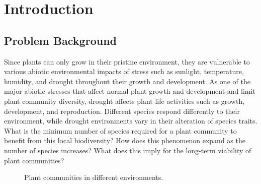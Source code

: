 \documentclass[12pt]{article}
\begin{document}

\clearpage
\pagestyle{fancy}

\tableofcontents

\newpage
\setcounter{page}{1}
\section{Introduction}

\subsection{Problem Background}

Since plants can only grow in their pristine environment, they are vulnerable to various abiotic environmental impacts of stress such as sunlight, temperature, humidity, and drought throughout their growth and development. As one of the major abiotic stresses that affect normal plant growth and development and limit plant community diversity, drought affects plant life activities such as growth, development, and reproduction. Different species respond differently to their environment, while drought environments vary in their alteration of species traits. What is the minimum number of species required for a plant community to benefit from this local biodiversity? How does this phenomenon expand as the number of species increases? What does this imply for the long-term viability of plant communities?

\begin{figure}[htb]
	\centering
	\caption{Plant communities in different environments.}
\end{figure}
\end{document}
